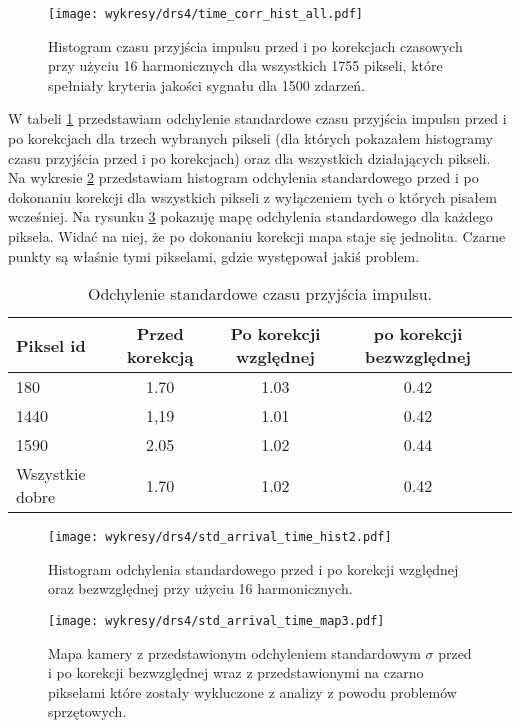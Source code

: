 \documentclass[a4paper,11pt,twoside]{article}
\begin{document}
\begin{figure}[H] 
\centering
\texttt{[image: wykresy/drs4/time\_corr\_hist\_all.pdf]}
\caption{Histogram czasu przyjścia impulsu przed i po korekcjach czasowych przy użyciu 16 harmonicznych dla wszystkich 1755 pikseli, które spełniały kryteria jakości sygnału dla 1500 zdarzeń.}
\label{fig:time_corr_hist_all}
\end{figure}
W tabeli \ref{tab:std} przedstawiam odchylenie standardowe czasu przyjścia impulsu przed i po korekcjach dla trzech wybranych pikseli (dla których pokazałem histogramy czasu przyjścia przed i po korekcjach) oraz dla wszystkich działających pikseli. Na wykresie \ref{fig:std_hist_time_corr} przedstawiam histogram odchylenia standardowego przed i po dokonaniu korekcji dla wszystkich pikseli z wyłączeniem tych o których pisałem wcześniej. Na rysunku \ref{fig:std_map_time_corr} pokazuję mapę odchylenia standardowego dla każdego piksela. Widać na niej, że po dokonaniu korekcji mapa staje się jednolita. Czarne punkty są właśnie tymi pikselami, gdzie występował jakiś problem.
\begin{table}[H]
\caption{Odchylenie standardowe czasu przyjścia impulsu.}
\begin{tabular}{|l|c|c|c|l|}
\hline
Piksel id & Przed korekcją  & Po korekcji względnej  & po korekcji bezwzględnej   \\ \hline
180  & 1.70  & 1.03  & 0.42    \\ \hline
1440 & 1,19  & 1.01  & 0.42    \\  \hline
1590 & 2.05  & 1.02  & 0.44    \\  \hline
Wszystkie dobre & 1.70  & 1.02 & 0.42   \\  \hline
\end{tabular}
\label{tab:std}
\end{table}
\begin{figure}[H] 
\centering
\texttt{[image: wykresy/drs4/std\_arrival\_time\_hist2.pdf]}
\caption{Histogram odchylenia standardowego przed i po korekcji względnej oraz bezwzględnej przy użyciu 16 harmonicznych.}
\label{fig:std_hist_time_corr}
\end{figure}

\begin{figure}[H] 
\centering
\texttt{[image: wykresy/drs4/std\_arrival\_time\_map3.pdf]}
\caption{Mapa kamery z przedstawionym odchyleniem standardowym $\sigma$ przed i po korekcji bezwzględnej wraz z przedstawionymi na czarno pikselami które zostały wykluczone z analizy z powodu problemów sprzętowych.}
\label{fig:std_map_time_corr}
\end{figure}
\end{document}
